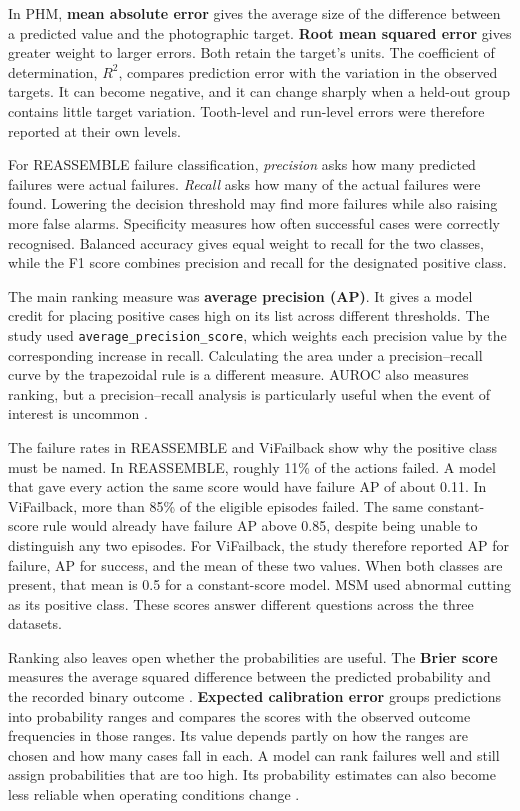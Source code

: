 In PHM, \textbf{mean absolute error} gives the average size of the difference between a
predicted value and the photographic target. \textbf{Root mean squared error} gives
greater weight to larger errors. Both retain the target’s units. The coefficient of
determination, \(R^2\), compares prediction error with the variation in the observed
targets. It can become negative, and it can change sharply when a held-out group
contains little target variation. Tooth-level and run-level errors were therefore
reported at their own levels.

For REASSEMBLE failure classification, \emph{precision} asks how many predicted failures
were actual failures. \emph{Recall} asks how many of the actual failures were found.
Lowering the decision threshold may find more failures while also raising more false
alarms. Specificity measures how often successful cases were correctly recognised.
Balanced accuracy gives equal weight to recall for the two classes, while the F1 score
combines precision and recall for the designated positive class.

The main ranking measure was \textbf{average precision (AP)}. It gives a model credit
for placing positive cases high on its list across different thresholds. The study used
\texttt{average\_precision\_score}, which weights each precision value by the
corresponding increase in recall. Calculating the area under a precision–recall curve by
the trapezoidal rule is a different measure. AUROC also measures ranking, but a
precision–recall analysis is particularly useful when the event of interest is uncommon
\parencite{Saito2015PrecisionRecall}.

The failure rates in REASSEMBLE and ViFailback show why the positive class must be
named. In REASSEMBLE, roughly 11\% of the actions failed. A model that gave every action
the same score would have failure AP of about 0.11. In ViFailback, more than 85\% of the
eligible episodes failed. The same constant-score rule would already have failure AP
above 0.85, despite being unable to distinguish any two episodes. For ViFailback, the
study therefore reported AP for failure, AP for success, and the mean of these two
values. When both classes are present, that mean is 0.5 for a constant-score model. MSM
used abnormal cutting as its positive class. These scores answer different questions
across the three datasets.

Ranking also leaves open whether the probabilities are useful. The \textbf{Brier score}
measures the average squared difference between the predicted probability and the
recorded binary outcome \parencite{P055}. \textbf{Expected calibration error} groups
predictions into probability ranges and compares the scores with the observed outcome
frequencies in those ranges. Its value depends partly on how the ranges are chosen and
how many cases fall in each. A model can rank failures well and still assign
probabilities that are too high. Its probability estimates can also become less reliable
when operating conditions change \parencite{P008}.


